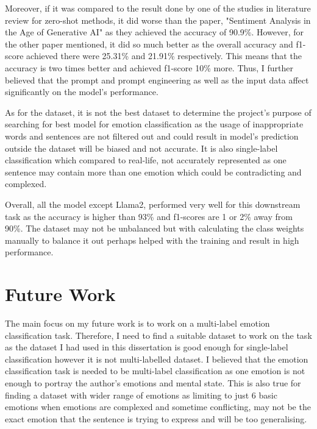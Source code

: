 Moreover, if it was compared to the result done by one of the studies in literature review for zero-shot methods, it did worse than the paper, "Sentiment Analysis in the Age of Generative AI"\cite{Krugmann_Hartmann_2024} as they achieved the accuracy of 90.9\%. However, for the other paper mentioned, it did so much better as the overall accuracy and f1-score achieved there were 25.31\% and 21.91\% respectively. This means that the accuracy is two times better and achieved f1-score 10\% more. Thus, I further believed that the prompt and prompt engineering as well as the input data affect significantly on the model's performance.

As for the dataset, it is not the best dataset to determine the project's purpose of searching for best model for emotion classification as the usage of inappropriate words and sentences are not filtered out and could result in model's prediction outside the dataset will be biased and not accurate. It is also single-label classification which compared to real-life, not accurately represented as one sentence may contain more than one emotion which could be contradicting and complexed.

Overall, all the model except Llama2, performed very well for this downstream task as the accuracy is higher than 93\% and f1-scores are 1 or 2\% away from 90\%. The dataset may not be unbalanced but with calculating the class weights manually to balance it out perhaps helped with the training and result in high performance. 
\bigskip
\bigskip
\bigskip
\bigskip
\bigskip
\bigskip
\bigskip
\bigskip
\bigskip
\bigskip
\bigskip
\bigskip
\bigskip
\bigskip
\bigskip
\bigskip
\bigskip
\bigskip
\bigskip
\bigskip
\bigskip

\section{Future Work}

The main focus on my future work is to work on a multi-label emotion classification task. Therefore, I need to find a suitable dataset to work on the task as the dataset I had used in this dissertation is good enough for single-label classification however it is not multi-labelled dataset. I believed that the emotion classification task is needed to be multi-label classification as one emotion is not enough to portray the author's emotions and mental state. This is also true for finding a dataset with wider range of emotions as limiting to just 6 basic emotions when emotions are complexed and sometime conflicting, may not be the exact emotion that the sentence is trying to express and will be too generalising. 

